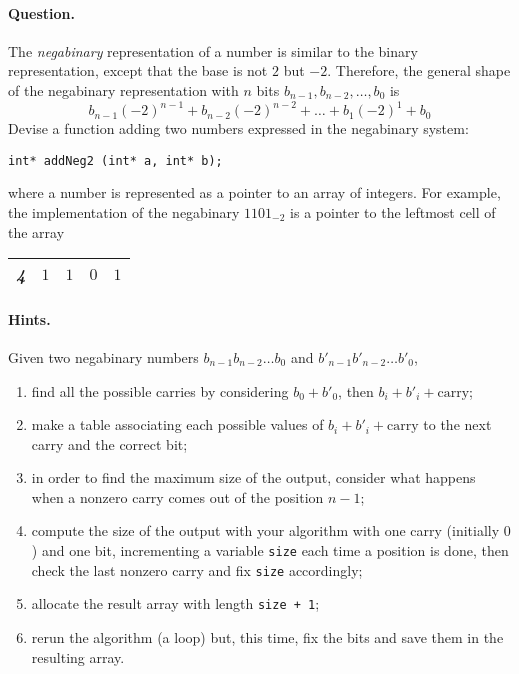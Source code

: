 \paragraph{Question.} The \emph{negabinary} representation of a number
is similar to the binary representation, except that the base is not
\(2\) but \(-2\). Therefore, the general shape of the negabinary
representation with \(n\) bits \(b_{n-1}, b_{n-2}, \dots, b_0\) is
\[
b_{n-1}(-2)^{n-1} + b_{n-2}(-2)^{n-2} + \dots + b_1(-2)^1 + b_0
\]
Devise a \C function adding two numbers expressed in the negabinary
system: {\small
\begin{verbatim}
int* addNeg2 (int* a, int* b);
\end{verbatim}
}
\noindent where a number is represented as a pointer to an array of
integers. For example, the implementation of the negabinary
\(1101_{-2}\) is a pointer to the leftmost cell of the array
\begin{center}
\begin{tabular}{|c|c|c|c|c|}
\hline
\emph{\textbf{4}} & \(1\) & \(1\) & \(0\) & \(1\)\\
\hline
\end{tabular}
\end{center}

\paragraph{Hints.} Given two negabinary numbers \(b_{n-1}b_{n-2}\dots{b_0}\)
and \(b'_{n-1}b'_{n-2}\dots{b'_0}\), 
\begin{enumerate}

   \item find all the possible carries by considering \(b_0 + b'_0\),
     then \(b_i + b'_i + \text{carry}\);

  \item make a table associating each possible values of \(b_i + b'_i
    + \text{carry}\) to the next carry and the correct bit;

  \item in order to find the maximum size of the output, consider what
    happens when a nonzero carry comes out of the position \(n-1\);

  \item compute the size of the output with your algorithm with one
    carry (initially \(0\)) and one bit, incrementing a variable
    \texttt{size} each time a position is done, then check the last
    nonzero carry and fix \texttt{size} accordingly;

  \item allocate the result array with length \texttt{size + 1};

  \item rerun the algorithm (a loop) but, this time, fix the bits and
    save them in the resulting array.

\end{enumerate}

